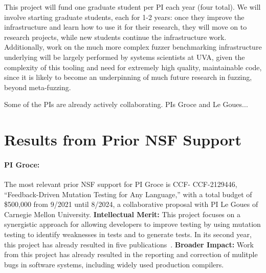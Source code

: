 \documentclass[numbers]{proposalnsf}
\begin{document}
This project will fund one graduate student per PI each year
(four total).  We will
involve starting graduate students, each for 1-2 years: once they
improve the infrastructure and learn how to use it for their research,
they will move on to research projects, while new
students continue the infrastructure work.  Additionally, work on the much more complex fuzzer benchmarking infrastructure underlying will be largely performed by systems scientists at UVA, given the complexity of this tooling and need for extremely high quality, maintainable code, since it is likely to become an underpinning of much future research in fuzzing, beyond meta-fuzzing.


Some of the PIs are already actively collaborating.
PIs Groce and Le Goues...





\section{Results from Prior NSF Support}

\paragraph{PI Groce:}
The most relevant prior NSF support for PI Groce is CCF-
CCF-2129446, ``Feedback-Driven Mutation Testing for Any Language,'' with a total budget of \$500,000 from 9/2021 until 8/2024,
a collaborative proposal with PI Le Goues of Carnegie Mellon
University. {\bf Intellectual Merit:} This project
focuses on a synergistic approach for allowing developers
to improve testing by using mutation testing to identify
weaknesses in tests and to generate tests.  In its second
year,  this project has already resulted in five
publications~\cite{cc2022,seip2022,fuzzing22}. {\bf
  Broader
  Impact:}  Work from this project has already
resulted in the reporting and correction of mulitple bugs in software
systems, including widely used production compilers.

\newpage
%


\end{document}
